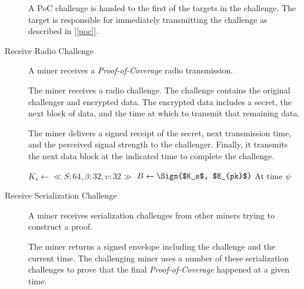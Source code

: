 \documentclass[10pt, nonatbib, nocopyrightspace, reprint]{sigplanconf}
\newenvironment{protocol}[2]{
  \begin{algorithm}[!htb]
    \DontPrintSemicolon
    \caption{#1}\label{#2}
}{
  \end{algorithm}
  \FloatBarrier
}
\newcommand{\secref}[1]{[\autoref{#1}]}
\begin{document}
\begin{description}
    A PoC challenge is handed to the first of the targets in the challenge. The target is responsible for immediately transmitting the challenge as described in \secref{poc}.

    \begin{protocol}{Miner PoC Challenge Transmit}{proto:miner.recv.poc.challenge}

       {
        \;
      }
    \end{protocol}



  \item [Receive Radio Challenge] A miner receives a \emph{Proof-of-Coverage} radio transmission.

    The miner receives a radio challenge. The challenge contains the original challenger and encrypted data. The encrypted data includes a secret, the next block of data, and the time at which to transmit that remaining data.

    The miner delivers a signed receipt of the secret, next transmission time, and the perceived signal strength to the challenger. Finally, it transmits the next data block at the indicated time to complete the challenge.

    \begin{protocol}{Miner Receive Radio Challenge}{proto:miner.recv.challenge.radio}

       {
         {
           {
            $K_s \leftarrow \ll S:64, \beta:32, \upsilon:32 \gg $\;
            $B \leftarrow \Sign{$K_s$, $E_{pk}$} $\;
            \;
            At time $\psi$ \;
          }
        }
      }
    \end{protocol}


  \item [Receive Serialization Challenge] A miner receives serialization challenges from other miners trying to construct a proof.

    The miner returns a signed envelope including the challenge and the current time. The challenging miner uses a number of these serialization challenges to prove that the final \emph{Proof-of-Coverage} happened at a given time.


\end{description}
\end{document}
